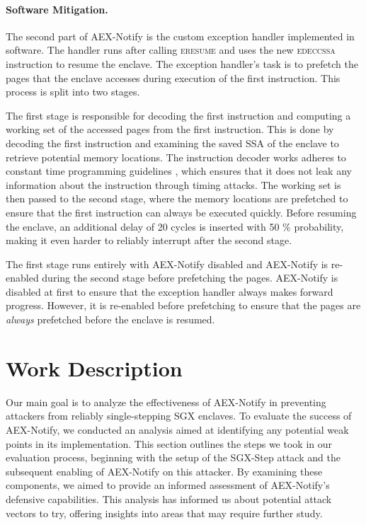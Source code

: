 \documentclass{llncs}
\begin{document}
\paragraph{Software Mitigation.}
The second part of AEX-Notify is the custom exception handler implemented in
software.
The handler runs after calling \textsc{eresume} and
uses the new \textsc{edeccssa} instruction to resume the enclave.
The exception handler's task is to prefetch the pages that the enclave accesses
during execution of the first instruction.
This process is split into two stages.

The first stage is responsible for decoding the first instruction and computing
a working set of the accessed pages from the first instruction.
This is done by decoding the first instruction and examining the saved SSA of
the enclave to retrieve potential memory locations.
The instruction decoder works adheres to constant time programming guidelines
\cite{Intel22}, which ensures that it does not leak any information about the
instruction through timing attacks.
The working set is then passed to the second stage, where the memory locations
are prefetched to ensure that the first instruction can always be executed
quickly.
Before resuming the enclave, an additional delay of 20 cycles is inserted with
50 \% probability, making it even harder to reliably interrupt after the second
stage.


The first stage runs entirely with AEX-Notify disabled
and AEX-Notify is re-enabled during the second stage before prefetching the pages.
AEX-Notify is disabled at first to ensure that the exception handler always
makes forward progress.
However, it is re-enabled before prefetching to ensure that the pages are
\emph{always} prefetched before the enclave is resumed.

\section{Work Description}

Our main goal is to analyze the effectiveness of AEX-Notify
in preventing attackers from reliably single-stepping SGX enclaves.
To evaluate the success of AEX-Notify, we conducted an analysis aimed at
identifying any potential weak points in its implementation.
This section outlines the steps we took in our evaluation process,
beginning with the setup of the SGX-Step attack and
the subsequent enabling of AEX-Notify on this attacker.
By examining these components,
we aimed to provide an informed assessment of AEX-Notify’s defensive capabilities.
This analysis has informed us about potential attack vectors to try,
offering insights into areas that may require further study.
\end{document}
